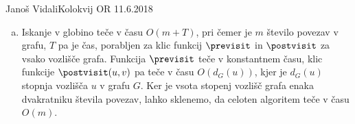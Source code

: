 \begin{naloga}{Janoš Vidali}{Kolokvij OR 11.6.2018}
\begin{odgovor}
\begin{enumerate}[(a)]
\item Iskanje v globino teče v času $O(m + T)$,
pri čemer je $m$ število povezav v grafu,
$T$ pa je čas,
porabljen za klic funkcij $\previsit$ in $\postvisit$ za vsako vozlišče grafa.
Funkcija $\previsit$ teče v konstantnem času,
klic funkcije $\postvisit(u, v)$ pa teče v času $O(d_G(u))$,
kjer je $d_G(u)$ stopnja vozlišča $u$ v grafu $G$.
Ker je vsota stopenj vozlišč grafa enaka dvakratniku števila povezav,
lahko sklenemo, da celoten algoritem teče v času $O(m)$.
\end{enumerate}
%
\begin{slika}
\end{slika}
\end{odgovor}
\end{naloga}
